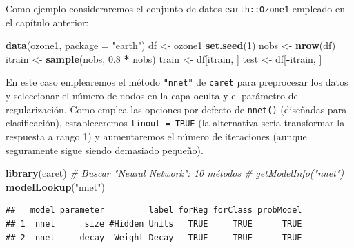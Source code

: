 \documentclass[
]{book}
\newenvironment{Shaded}{\begin{snugshade}}{\end{snugshade}}
\newcommand{\CommentTok}[1]{\textcolor[rgb]{0.56,0.35,0.01}{\textit{#1}}}
\newcommand{\DataTypeTok}[1]{\textcolor[rgb]{0.13,0.29,0.53}{#1}}
\newcommand{\DecValTok}[1]{\textcolor[rgb]{0.00,0.00,0.81}{#1}}
\newcommand{\FloatTok}[1]{\textcolor[rgb]{0.00,0.00,0.81}{#1}}
\newcommand{\KeywordTok}[1]{\textcolor[rgb]{0.13,0.29,0.53}{\textbf{#1}}}
\newcommand{\NormalTok}[1]{#1}
\newcommand{\OperatorTok}[1]{\textcolor[rgb]{0.81,0.36,0.00}{\textbf{#1}}}
\newcommand{\StringTok}[1]{\textcolor[rgb]{0.31,0.60,0.02}{#1}}
\theoremstyle{break}
\theoremstyle{definition}
\theoremstyle{definition}
\theoremstyle{definition}
\theoremstyle{remark}
\begin{document}
Como ejemplo consideraremos el conjunto de datos \texttt{earth::Ozone1} empleado en el capítulo anterior:

\begin{Shaded}
\begin{Highlighting}[]
\KeywordTok{data}\NormalTok{(ozone1, }\DataTypeTok{package =} \StringTok{"earth"}\NormalTok{)}
\NormalTok{df <-}\StringTok{ }\NormalTok{ozone1}
\KeywordTok{set.seed}\NormalTok{(}\DecValTok{1}\NormalTok{)}
\NormalTok{nobs <-}\StringTok{ }\KeywordTok{nrow}\NormalTok{(df)}
\NormalTok{itrain <-}\StringTok{ }\KeywordTok{sample}\NormalTok{(nobs, }\FloatTok{0.8} \OperatorTok{*}\StringTok{ }\NormalTok{nobs)}
\NormalTok{train <-}\StringTok{ }\NormalTok{df[itrain, ]}
\NormalTok{test <-}\StringTok{ }\NormalTok{df[}\OperatorTok{-}\NormalTok{itrain, ]}
\end{Highlighting}
\end{Shaded}

En este caso emplearemos el método \texttt{"nnet"} de \texttt{caret} para preprocesar los datos y seleccionar el número de nodos en la capa oculta y el parámetro de regularización.
Como emplea las opciones por defecto de \texttt{nnet()} (diseñadas para clasificación),
estableceremos \texttt{linout\ =\ TRUE} (la alternativa sería transformar la respuesta a rango 1) y aumentaremos el número de iteraciones (aunque seguramente sigue siendo demasiado pequeño).

\begin{Shaded}
\begin{Highlighting}[]
\KeywordTok{library}\NormalTok{(caret)}
\CommentTok{# Buscar "Neural Network": 10 métodos}
\CommentTok{# getModelInfo("nnet")}
\KeywordTok{modelLookup}\NormalTok{(}\StringTok{"nnet"}\NormalTok{)}
\end{Highlighting}
\end{Shaded}

\begin{verbatim}
##   model parameter         label forReg forClass probModel
## 1  nnet      size #Hidden Units   TRUE     TRUE      TRUE
## 2  nnet     decay  Weight Decay   TRUE     TRUE      TRUE
\end{verbatim}
\end{document}
